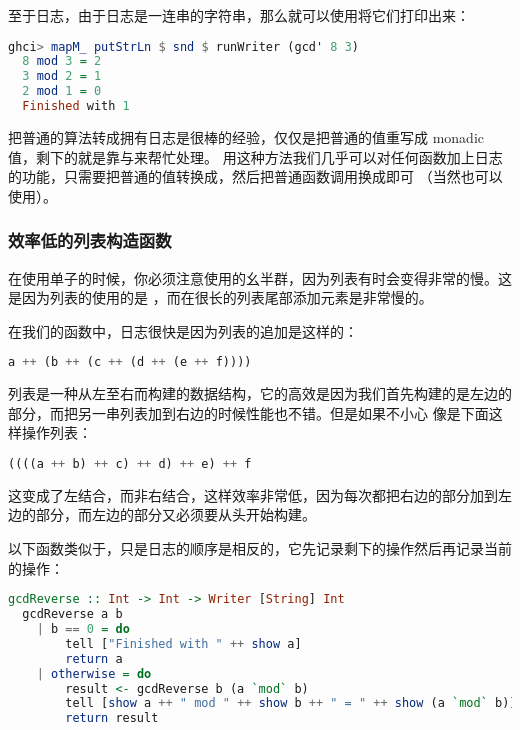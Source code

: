 \documentclass[./main.tex]{subfiles}
\begin{document}
至于日志，由于日志是一连串的字符串，那么就可以使用将它们打印出来：

\begin{lstlisting}[language=Haskell]
  ghci> mapM_ putStrLn $ snd $ runWriter (gcd' 8 3)
  8 mod 3 = 2
  3 mod 2 = 1
  2 mod 1 = 0
  Finished with 1
\end{lstlisting}

把普通的算法转成拥有日志是很棒的经验，仅仅是把普通的值重写成 monadic 值，剩下的就是靠\acode{>>=}与来帮忙处理。
用这种方法我们几乎可以对任何函数加上日志的功能，只需要把普通的值转换成，然后把普通函数调用换成\acode{>>=}即可
（当然也可以使用）。

\subsubsection*{效率低的列表构造函数}

在使用单子的时候，你必须注意使用的幺半群，因为列表有时会变得非常的慢。这是因为列表的使用的是
\acode{++}，而\acode{++}在很长的列表尾部添加元素是非常慢的。

在我们的函数中，日志很快是因为列表的追加是这样的：

\begin{lstlisting}[language=Haskell]
  a ++ (b ++ (c ++ (d ++ (e ++ f))))
\end{lstlisting}

列表是一种从左至右而构建的数据结构，它的高效是因为我们首先构建的是左边的部分，而把另一串列表加到右边的时候性能也不错。但是如果不小心
像是下面这样操作列表：

\begin{lstlisting}[language=Haskell]
  ((((a ++ b) ++ c) ++ d) ++ e) ++ f
\end{lstlisting}

这变成了左结合，而非右结合，这样效率非常低，因为每次都把右边的部分加到左边的部分，而左边的部分又必须要从头开始构建。

以下函数类似于，只是日志的顺序是相反的，它先记录剩下的操作然后再记录当前的操作：

\begin{lstlisting}[language=Haskell]
  gcdReverse :: Int -> Int -> Writer [String] Int
  gcdReverse a b
    | b == 0 = do
        tell ["Finished with " ++ show a]
        return a
    | otherwise = do
        result <- gcdReverse b (a `mod` b)
        tell [show a ++ " mod " ++ show b ++ " = " ++ show (a `mod` b)]
        return result
\end{lstlisting}
\end{document}
